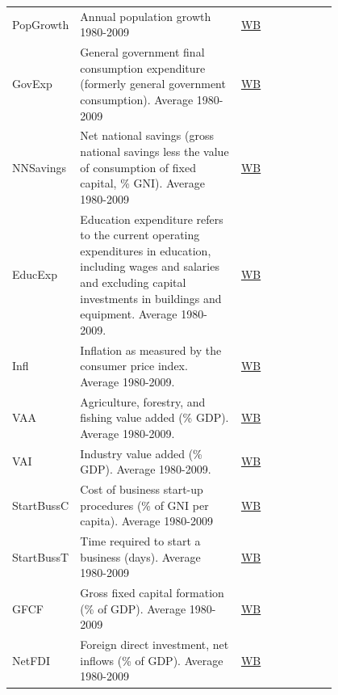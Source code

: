 \begin{refsection}
\begin{subappendices}
\begin{center}
\begin{longtable}{l p{0.50\linewidth} p{0.3\linewidth}}
      PopGrowth & Annual population growth 1980-2009 & \href{http://data.worldbank.org/indicator/SP.POP.GROW}{WB} \\
    
      GovExp & General government final consumption expenditure (formerly general government consumption). Average 1980-2009 & \href{http://data.worldbank.org/indicator/NE.CON.GOVT.ZS}{WB}\\
    
      NNSavings & Net national savings (gross national savings less the value of consumption of fixed capital, \% GNI). Average 1980-2009 & \href{http://data.worldbank.org/indicator/NY.ADJ.NNAT.GN.ZS}{WB} \\
    
      EducExp & Education expenditure refers to the current operating expenditures in education, including wages and salaries and excluding capital investments in buildings and equipment. Average 1980-2009. & \href{http://data.worldbank.org/indicator/NY.ADJ.AEDU.GN.ZS}{WB} \\
    
      Infl & Inflation as measured by the consumer price index. Average 1980-2009. & \href{http://data.worldbank.org/indicator/FP.CPI.TOTL.ZG}{WB} \\
    
      VAA & Agriculture, forestry, and fishing value added (\% GDP). Average 1980-2009. & \href{http://data.worldbank.org/indicator/NV.AGR.TOTL.ZS}{WB} \\
    
      VAI & Industry value added (\% GDP). Average 1980-2009. & \href{http://data.worldbank.org/indicator/NV.IND.TOTL.ZS}{WB} \\
    
      StartBussC & Cost of business start-up procedures (\% of GNI per capita). Average 1980-2009 & \href{http://data.worldbank.org/indicator/IC.REG.COST.PC.ZS}{WB} \\
    
      StartBussT & Time required to start a business (days). Average 1980-2009 & \href{http://data.worldbank.org/indicator/IC.REG.DURS}{WB} \\
    
      GFCF & Gross fixed capital formation (\% of GDP). Average 1980-2009 & \href{http://data.worldbank.org/indicator/NE.GDI.FTOT.ZS}{WB} \\
    
      NetFDI &  Foreign direct investment, net inflows (\% of GDP). Average 1980-2009 & \href{http://data.worldbank.org/indicator/BX.KLT.DINV.WD.GD.ZS}{WB} \\
    

\end{longtable}
\end{center}
\end{subappendices}
\end{refsection}
